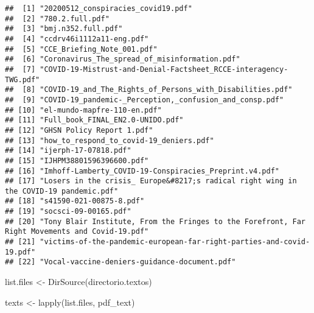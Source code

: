 \documentclass[
]{book}
\newenvironment{Shaded}{\begin{snugshade}}{\end{snugshade}}
\newcommand{\FunctionTok}[1]{\textcolor[rgb]{0.00,0.00,0.00}{#1}}
\newcommand{\NormalTok}[1]{#1}
\newcommand{\OtherTok}[1]{\textcolor[rgb]{0.56,0.35,0.01}{#1}}
\begin{document}
\begin{verbatim}
##  [1] "20200512_conspiracies_covid19.pdf"                                                            
##  [2] "780.2.full.pdf"                                                                               
##  [3] "bmj.n352.full.pdf"                                                                            
##  [4] "ccdrv46i1112a11-eng.pdf"                                                                      
##  [5] "CCE_Briefing_Note_001.pdf"                                                                    
##  [6] "Coronavirus_The_spread_of_misinformation.pdf"                                                 
##  [7] "COVID-19-Mistrust-and-Denial-Factsheet_RCCE-interagency-TWG.pdf"                              
##  [8] "COVID-19_and_The_Rights_of_Persons_with_Disabilities.pdf"                                     
##  [9] "COVID-19_pandemic-_Perception,_confusion_and_consp.pdf"                                       
## [10] "el-mundo-mapfre-110-en.pdf"                                                                   
## [11] "Full_book_FINAL_EN2.0-UNIDO.pdf"                                                              
## [12] "GHSN Policy Report 1.pdf"                                                                     
## [13] "how_to_respond_to_covid-19_deniers.pdf"                                                       
## [14] "ijerph-17-07818.pdf"                                                                          
## [15] "IJHPM38801596396600.pdf"                                                                      
## [16] "Imhoff-Lamberty_COVID-19-Conspiracies_Preprint.v4.pdf"                                        
## [17] "Losers in the crisis_ Europe&#8217;s radical right wing in the COVID-19 pandemic.pdf"         
## [18] "s41590-021-00875-8.pdf"                                                                       
## [19] "socsci-09-00165.pdf"                                                                          
## [20] "Tony Blair Institute, From the Fringes to the Forefront, Far Right Movements and Covid-19.pdf"
## [21] "victims-of-the-pandemic-european-far-right-parties-and-covid-19.pdf"                          
## [22] "Vocal-vaccine-deniers-guidance-document.pdf"
\end{verbatim}

\begin{Shaded}
\begin{Highlighting}[]
\NormalTok{list.files }\OtherTok{\textless{}{-}} \FunctionTok{DirSource}\NormalTok{(directorio.textos)}

\NormalTok{texts }\OtherTok{\textless{}{-}} \FunctionTok{lapply}\NormalTok{(list.files, pdf\_text) }
\end{Highlighting}
\end{Shaded}
\end{document}
